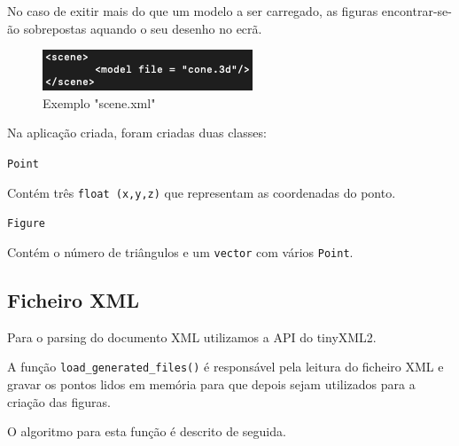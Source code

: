 \documentclass[a4paper]{article}
\begin{document}
No caso de exitir mais do que um modelo a ser carregado, as figuras encontrar-se-ão sobrepostas aquando o seu desenho no ecrã.

\begin{figure}[H]
\centering
\includegraphics[scale=0.70]{scene_xml.png}
\caption{Exemplo "scene.xml"}
\label{img:scene}
\end{figure}

Na aplicação criada, foram criadas duas classes:

\hspace{1cm} \texttt{Point}

\hspace{1cm} Contém três \texttt{float (x,y,z)} que representam as coordenadas do ponto.

\hspace{1cm} \texttt{Figure}

\hspace{1cm} Contém o número de triângulos e um \texttt{vector} com vários \texttt{Point}.

\subsection{Ficheiro XML}
Para o parsing do documento XML utilizamos a API do tinyXML2.

A função \texttt{load\_generated\_files()} é responsável pela leitura do ficheiro XML e gravar os pontos lidos em memória para que depois sejam utilizados para a criação das figuras.

O algoritmo para esta função é descrito de seguida.
\end{document}
